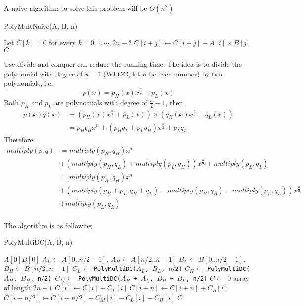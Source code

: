 			A naive algorithm to solve this problem will be $O(n^2)$
			\begin{algorithm}[h]
				\caption{PolyMultNaive(A, B, n)}
				\begin{algorithmic}[1]
					\State Let $C[k] = 0$ for every $k = 0, 1, \cdots, 2n - 2$
							\State $C[i + j] \gets C[i + j] + A[i] \times B[j]$
						\EndFor
					\EndFor
					\Return $C$
				\end{algorithmic}
			\end{algorithm}

			Use divide and conquer can reduce the running time. The idea is to divide the polynomial with degree of $n - 1$ (WLOG, let $n$ be even number) by two polynomials, i.e.
			\begin{equation}
				p(x) = p_H(x)x^{\frac{n}{2}} + p_L(x)
			\end{equation}
			Both $p_H$ and $p_L$ are polynomials with degree of $\frac{n}{2} - 1$, then
			\begin{align}
				p(x)q(x) &= (p_H(x)x^{\frac{n}{2}} + p_L(x)) \times (q_H(x)x^{\frac{n}{2}} + q_L(x))\\
						 &= p_Hq_H x^n + (p_Hq_L + p_Lq_H) x^{\frac{n}{2}} + p_Lq_L
			\end{align}
			Therefore
			\begin{align}
				multiply(p, q) &= multiply(p_H, q_H) x^n\\
							   &+ (multiply(p_H, q_L) + multiply(p_L, q_H)) x^{\frac{n}{2}} + multiply(p_L, q_L)\\
							   &= multiply(p_H, q_H) x^n\\
							   &+ (multiply(p_H + p_L, q_H + q_L) - multiply(p_H, q_H) - multiply(p_L, q_L)) x^{\frac{n}{2}} \\
							   &+ multiply(p_L, q_L)\\
			\end{align}

			The algorithm is as following
			\begin{algorithm}[h]
				\caption{PolyMultiDC(A, B, n)}
				\begin{algorithmic}[1]
						\Return $A[0]B[0]$
					\EndIf
					\State $A_L \gets A[0 .. n/2 - 1]$, $A_H \gets A[n/2 .. n - 1]$
					\State $B_L \gets B[0 .. n/2 - 1]$, $B_H \gets B[n/2 .. n - 1]$
					\State $C_L \gets $ \texttt{PolyMultiDC($A_L$, $B_L$, n/2)}
					\State $C_H \gets $ \texttt{PolyMultiDC($A_H$, $B_H$, n/2)}\
					\State $C_M \gets $ \texttt{PolyMultiDC($A_H$ + $A_L$, $B_H$ + $B_L$, n/2)}
					\State $C \gets $ 0 array of length $2n-1$
						\State $C[i] \gets C[i] + C_L[i]$
						\State $C[i + n] \gets C[i + n] + C_H[i]$
						\State $C[i + n/2] \gets C[i + n/2] + C_M[i] - C_L[i] - C_H[i]$
					\EndFor
					\Return $C$
				\end{algorithmic}
			\end{algorithm}


